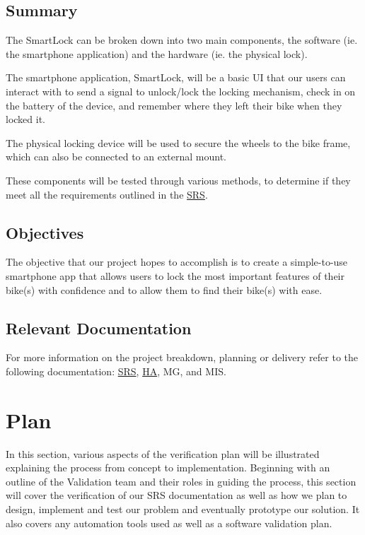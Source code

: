 \documentclass[12pt, titlepage]{article}
\begin{document}
\subsection{Summary}

The SmartLock can be broken down into two main components, the software (ie. the smartphone application) and the hardware (ie. the physical lock).

The smartphone application, SmartLock, will be a basic UI that our users can interact with to send a signal to unlock/lock the locking mechanism, check in on the battery of the device, and remember where they left their bike when they locked it.

The physical locking device will be used to secure the wheels to the bike frame, which can also be connected to an external mount.

These components will be tested through various methods, to determine if they meet all the requirements outlined in the \href{https://github.com/NevoAbigail/Capstone/blob/main/docs/SRS/SRS.pdf}{SRS}.

\subsection{Objectives}
The objective that our project hopes to accomplish is to create a simple-to-use smartphone app that allows users to lock the most important features of their bike(s) with confidence and to allow them to find their bike(s) with ease.

\subsection{Relevant Documentation}

For more information on the project breakdown, planning or delivery refer to the following documentation:
 \href{https://github.com/NevoAbigail/Capstone/blob/main/docs/SRS/SRS.pdf}{SRS},
 \href{https://github.com/NevoAbigail/Capstone/blob/main/docs/HazardAnalysis/HazardAnalysis.pdf}{HA}, MG, and MIS.
 

\section{Plan}

In this section, various aspects of the verification plan will be illustrated explaining the process from concept to implementation. Beginning with an outline of the Validation team and their roles in guiding the process, this section will cover the verification of our SRS documentation as well as how we plan to design, implement and test our problem and eventually prototype our solution. It also covers any automation tools used as well as a software validation plan.
\end{document}
